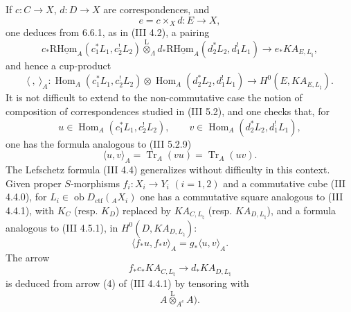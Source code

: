 \documentclass[11pt]{article}
\DeclareMathOperator{\Hom}{Hom}
\providecommand{\Tr}{\operatorname{Tr}}
\providecommand{\Tr}{\operatorname{Tr}}
\providecommand{\lten}{\overset{\mathrm L}{\otimes}}
\providecommand{\Ob}{\operatorname{ob}}
\providecommand{\Tr}{\operatorname{Tr}}
\providecommand{\Hom}{\operatorname{Hom}}
\providecommand{\lten}{\overset{\mathrm L}{\otimes}}
\providecommand{\lten}{\overset{\mathrm L}{\otimes}}
\providecommand{\Ob}{\operatorname{ob}}
\providecommand{\Tr}{\operatorname{Tr}}
\providecommand{\lten}{\overset{\mathrm L}{\otimes}}
\providecommand{\lten}{\overset{\mathrm L}{\otimes}}
\providecommand{\Ob}{\operatorname{Ob}}
\providecommand{\lten}{\overset{\mathrm L}{\otimes}}
\providecommand{\Hom}{\operatorname{Hom}}
\providecommand{\Tr}{\operatorname{Tr}}
\providecommand{\Ob}{\operatorname{ob}}
\providecommand{\Ob}{\operatorname{Ob}}
\providecommand{\lten}{\overset{\mathrm L}{\otimes}}
\begin{document}
If $c:C\to X$, $d:D\to X$ are correspondences, and
\[
e=c\times_Xd:E\to X,
\]
one deduces from 6.6.1, as in (III 4.2), a pairing
\begin{equation}
c_*\mathrm{R}\underline{\mathrm{Hom}}_A(c_1^*L_1,c_2^!L_2)
\lten_{\Lambda}
d_*\mathrm{R}\underline{\mathrm{Hom}}_A(d_2^*L_2,d_1^!L_1)
\longrightarrow
e_*KA_{E,L_{\natural}},
\tag{6.6.2}
\end{equation}
and hence a cup-product
\begin{equation}
\langle\ ,\ \rangle_A:
\Hom_A(c_1^*L_1,c_2^!L_2)\otimes
\Hom_A(d_2^*L_2,d_1^!L_1)
\longrightarrow
H^0(E,KA_{E,L_{\natural}}).
\tag{6.6.3}
\end{equation}
It is not difficult to extend to the non-commutative case the notion of composition of correspondences studied in (III 5.2), and one checks that, for
\[
u\in\Hom_A(c_1^*L_1,c_2^!L_2),\qquad
v\in\Hom_A(d_2^*L_2,d_1^!L_1),
\]
one has the formula analogous to (III 5.2.9)
\begin{equation}
\langle u,v\rangle_A=\Tr_A(vu)=\Tr_A(uv).
\tag{6.6.4}
\end{equation}
The Lefschetz formula (III 4.4) generalizes without difficulty in this context. Given proper $S$-morphisms $f_i:X_i\to Y_i$ $(i=1,2)$ and a commutative cube (III 4.4.0), for $L_i\in\Ob D_{\mathrm{ctf}}({}_AX_i)$ one has a commutative square analogous to (III 4.4.1), with $K_C$ (resp. $K_D$) replaced by $KA_{C,L_{\natural}}$ (resp. $KA_{D,L_{\natural}}$), and a formula analogous to (III 4.5.1), in $H^0(D,KA_{D,L_{\natural}})$:
\begin{equation}
\langle f_*u,f_*v\rangle_A=g_*\langle u,v\rangle_A.
\tag{6.6.5}
\end{equation}
The arrow
\[
f_*c_*KA_{C,L_{\natural}}\longrightarrow d_*KA_{D,L_{\natural}}
\]
is deduced from arrow (4) of (III 4.4.1) by tensoring with
\[
A\lten_{A^e}A ).
\]
\end{document}
